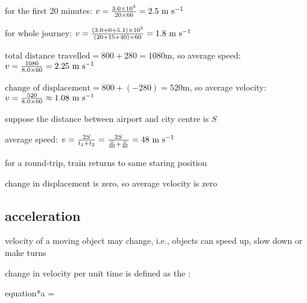 \begin{soln} for the first 20 minutes: $ v = \frac{3.0\times10^3}{20 \times 60} = 2.5 \text{ m s$^{-1}$}$

\eqyskip for whole journey: $v = \frac{(3.0+0+5.1)\times10^3}{(20+15+40)\times60} = 1.8 \text{ m s$^{-1}$} $ 
\end{soln}


\begin{soln} $\text{total distance travelled} = 800 + 280 = 1080 \text{m}$, so average speed: $v = \frac{1080}{8.0\times60} = 2.25 \text{ m s$^{-1}$}$

\eqyskip  $\text{change of displacement} = 800 + (-280) = 520 \text{m}$, so average velocity: $v = \frac{520}{8.0\times60} \approx 1.08 \text{ m s$^{-1}$}$ \end{soln}


\begin{soln} suppose the distance between airport and city centre is $S$

average speed: $v = \frac{2S}{t_1 + t_2} = \frac{2S}{\frac{S}{60} + \frac{S}{40}} = 48 \text{ m s$^{-1}$}$

for a round-trip, train returns to same staring position

change in displacement is zero, so average velocity is zero \end{soln} 



\subsection{acceleration}

velocity of a moving object may change, i.e., objects can speed up, slow down or make turns

\begin{ilight}
	\centering change in velocity per unit time is defined as the : \begin{empheq}[box=\tcbhighmath]{equation*}{a = }\end{empheq}
\end{ilight}

